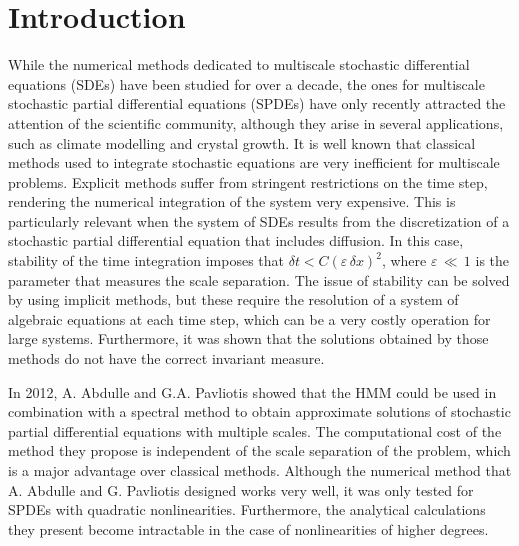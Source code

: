 \section{Introduction}
\label{sec:introduction}
While the numerical methods dedicated to multiscale stochastic differential
equations (SDEs) have been studied for over a decade, the ones for multiscale
stochastic partial differential equations (SPDEs) have only recently attracted
the attention of the scientific community, although they arise in several
applications, such as climate modelling and crystal growth. It is well known
that classical methods used to integrate stochastic equations are very
inefficient for multiscale problems.  Explicit methods suffer from stringent
restrictions on the time step, rendering the numerical integration of the
system very expensive.  This is particularly relevant when the system of SDEs
results from the discretization of a stochastic partial differential equation
that includes diffusion. In this case, stability of the time integration
imposes that ${\delta}t < C({\varepsilon}\,{\delta}x)^{2}$, where
${\varepsilon}\,{\ll}\,1$ is the parameter that measures the scale separation.
The issue of stability can be solved by using implicit methods, but these
require the resolution of a system of algebraic equations at each time step,
which can be a very costly operation for large systems. Furthermore, it was
shown that the solutions obtained by those methods do not have the correct
invariant measure.

In 2012, A. Abdulle and G.A.  Pavliotis showed that the HMM could be used in
combination with a spectral method to obtain appro\-ximate solutions of
stochastic partial differential equations with multiple scales. The
computational cost of the method they propose is independent of the scale
separation of the problem, which is a major advantage over classical methods.
Although the numerical method that A. Abdulle and G. Pavliotis designed works
very well, it was only tested for SPDEs with quadratic nonlinearities.
Furthermore, the analytical calculations they present become intractable in the
case of nonlinearities of higher degrees. 

